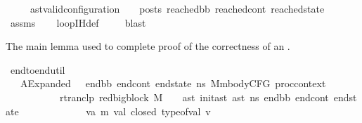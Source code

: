 \begin{isabellebody}
\ \ \ \ \ {\isachardoublequoteopen}{\isacharparenleft}{\kern0pt}ast{\isacharunderscore}{\kern0pt}valid{\isacharunderscore}{\kern0pt}configuration\ {\isasymLambda}\ {\isasymGamma}\ {\isasymOmega}\ posts\ reached{\isacharunderscore}{\kern0pt}bb\ reached{\isacharunderscore}{\kern0pt}cont\ reached{\isacharunderscore}{\kern0pt}state{\isacharparenright}{\kern0pt}{\isachardoublequoteclose}\isanewline
%
\isadelimproof
\ \ %
\endisadelimproof
%
\isatagproof
{}\isamarkupfalse%
\ assms\isanewline
\ \ \isamarkupfalse%
\ loop{\isacharunderscore}{\kern0pt}IH{\isacharunderscore}{\kern0pt}def\ \isanewline
\ \ \isamarkupfalse%
\ blast%
\endisatagproof
{\isafoldproof}%
%
\isadelimproof
%
\endisadelimproof
%
\isadelimdocument
%
\endisadelimdocument
%
\isatagdocument
%
\isamarkuptrue%
%
\endisatagdocument
{\isafolddocument}%
%
\isadelimdocument
%
\endisadelimdocument
%
\begin{isamarkuptext}%
The main lemma used to complete proof of the correctness of an .%
\end{isamarkuptext}\isamarkuptrue%
\isamarkupfalse%
\ end{\isacharunderscore}{\kern0pt}to{\isacharunderscore}{\kern0pt}end{\isacharunderscore}{\kern0pt}util{}{\isacharcolon}{\kern0pt}\isanewline
\ \ \ AExpanded{\isacharcolon}{\kern0pt}\ {\isachardoublequoteopen}{\isasymAnd}\ {\isasymGamma}\ end{\isacharunderscore}{\kern0pt}bb\ end{\isacharunderscore}{\kern0pt}cont\ end{\isacharunderscore}{\kern0pt}state\ ns\ {\isacharparenleft}{\kern0pt}M{\isacharcolon}{\kern0pt}{\isacharcolon}{\kern0pt}mbodyCFG\ proc{\isacharunderscore}{\kern0pt}context{\isacharparenright}{\kern0pt}{\isachardot}{\kern0pt}\isanewline
\ \ \ \ \ \ \ \ \ \ \ rtranclp\ {\isacharparenleft}{\kern0pt}red{\isacharunderscore}{\kern0pt}bigblock\ M\ {\isasymLambda}\ {\isasymGamma}\ {\isacharbrackleft}{\kern0pt}{\isacharbrackright}{\kern0pt}\ ast{\isacharparenright}{\kern0pt}\ {\isacharparenleft}{\kern0pt}init{\isacharunderscore}{\kern0pt}ast\ ast\ ns{\isacharparenright}{\kern0pt}\ {\isacharparenleft}{\kern0pt}end{\isacharunderscore}{\kern0pt}bb{\isacharcomma}{\kern0pt}\ end{\isacharunderscore}{\kern0pt}cont{\isacharcomma}{\kern0pt}\ end{\isacharunderscore}{\kern0pt}state{\isacharparenright}{\kern0pt}\ {\isasymLongrightarrow}\isanewline
\ \ \ \ \ \ \ \ \ \ \ {\isacharparenleft}{\kern0pt}{\isasymAnd}\ v{\isacharcolon}{\kern0pt}{\isacharcolon}{\kern0pt}{\isacharparenleft}{\kern0pt}{\isacharprime}{\kern0pt}a{\isacharcomma}{\kern0pt}\ {\isacharprime}{\kern0pt}m{\isacharparenright}{\kern0pt}\ val{\isachardot}{\kern0pt}\ {\isacharparenleft}{\kern0pt}closed\ {\isacharparenleft}{\kern0pt}{\isacharparenleft}{\kern0pt}type{\isacharunderscore}{\kern0pt}of{\isacharunderscore}{\kern0pt}val{\isacharparenright}{\kern0pt}\ v{\isacharparenright}{\kern0pt}{\isacharparenright}{\kern0pt}{\isacharparenright}{\kern0pt}\ {\isasymLongrightarrow}\isanewline

\end{isabellebody}

